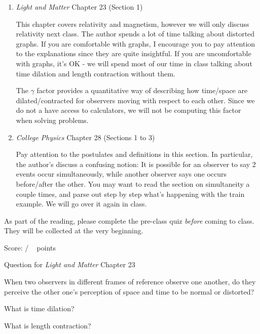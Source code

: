 \documentclass[addpoints,12pt]{exam}
\begin{document}
\begin{enumerate}


	\item \textit{Light and Matter} Chapter 23 (Section 1)
	
	This chapter covers relativity and magnetism, however we will only discuss relativity next class. The author spends a lot of time talking about distorted graphs. If you are comfortable with graphs, I encourage you to pay attention to the explanations since they are quite insightful. If you are uncomfortable with graphs, it's OK - we will spend most of our time in class talking about time dilation and length contraction without them.
	
	The $\gamma$ factor provides a quantitative way of describing how time/space are dilated/contracted for observers moving with respect to each other. Since we do not a have access to calculators, we will not be computing this factor when solving problems.
	
	\item \textit{College Physics} Chapter 28 (Sections 1 to 3)
	
	Pay attention to the postulates and definitions in this section. In particular, the author's discuss a confusing notion: It is possible for an observer to say 2 events occur simultaneously, while another observer says one occurs before/after the other. You may want to read the section on simultaneity a couple times, and parse out step by step what's happening with the train example. We will go over it again in class.
	
\end{enumerate}

As part of the reading, please complete the pre-class quiz \textit{before} coming to class. They will be collected at the very beginning.
 
\clearpage

\begin{flushright}
Score: \hspace{0.2in} / \numpoints ~ points
\end{flushright}


\noindent Question for \textit{Light and Matter} Chapter 23
\begin{questions}

\question[1]
When two observers in different frames of reference observe one another, do they perceive the other one's perception of space and time to be normal or distorted?
\fillwithlines{0.5in}

\question[1]
What is time dilation?
\fillwithlines{0.5in}

\question[1]
What is length contraction?
\fillwithlines{0.5in}

\end{questions}
\end{document}
